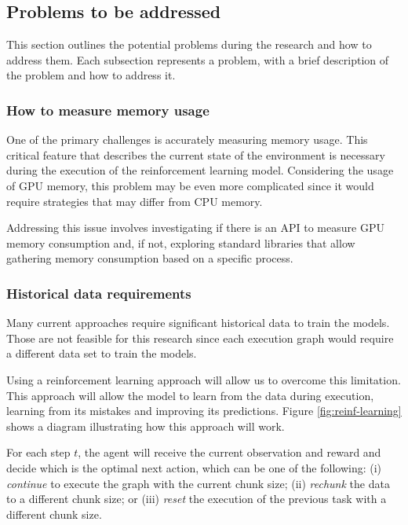 \subsection{Problems to be addressed}
\label{subsec:problems-to-be-addressed}

This section outlines the potential problems during the research and how to address them.
Each subsection represents a problem, with a brief description of the problem and how to address it.

\subsubsection{How to measure memory usage}

One of the primary challenges is accurately measuring memory usage.
This critical feature that describes the current state of the environment is necessary during the execution of the reinforcement learning model.
Considering the usage of \ac{GPU} memory, this problem may be even more complicated since it would require strategies that may differ from \ac{CPU} memory.

Addressing this issue involves investigating if there is an API to measure \ac{GPU} memory consumption and, if not, exploring standard libraries that allow gathering memory consumption based on a specific process.

\subsubsection{Historical data requirements}

Many current approaches require significant historical data to train the models.
Those are not feasible for this research since each execution graph would require a different data set to train the models.

Using a reinforcement learning approach will allow us to overcome this limitation.
This approach will allow the model to learn from the data during execution, learning from its mistakes and improving its predictions.
Figure \ref{fig:reinf-learning} shows a diagram illustrating how this approach will work.

For each step $t$, the agent will receive the current observation and reward and decide which is the optimal next action, which can be one of the following:
(i) \textit{continue} to execute the graph with the current chunk size;
(ii) \textit{rechunk} the data to a different chunk size;
or (iii) \textit{reset} the execution of the previous task with a different chunk size.

